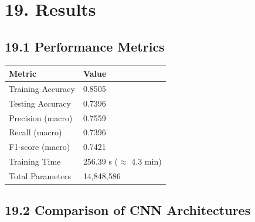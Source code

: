 \documentclass[11pt]{article}
\begin{document}
\section*{19. Results}

\subsection*{19.1 Performance Metrics}

\begin{center}

\begin{tabular}{|p{5cm}|p{4cm}|}

\hline

Metric & Value\\

\hline

Training Accuracy & 0.8505\\

\hline

Testing Accuracy & 0.7396\\

\hline

Precision (macro) & 0.7559\\

\hline

Recall (macro) & 0.7396\\

\hline

F1-score (macro) & 0.7421\\

\hline

Training Time & 256.39 s ($\approx$ 4.3 min)\\

\hline

Total Parameters & 14,848,586\\

\hline

\end{tabular}

\end{center}

\vspace{5mm}

\subsection*{19.2 Comparison of CNN Architectures}
\end{document}

